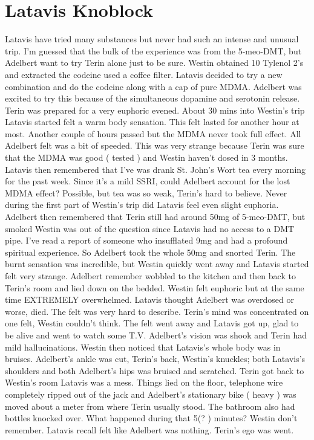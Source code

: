 \documentclass[12pt]{book}
\begin{document}
\chapter{Latavis Knoblock}

Latavis have tried many substances but never had such an intense and unusual trip. I'm guessed that the bulk of the experience was from the 5-meo-DMT, but Adelbert want to try Terin alone just to be sure. Westin obtained 10 Tylenol 2's and extracted the codeine used a coffee filter. Latavis decided to try a new combination and do the codeine along with a cap of pure MDMA. Adelbert was excited to try this because of the simultaneous dopamine and serotonin release. Terin was prepared for a very euphoric evened. About 30 mins into Westin's trip Latavis started felt a warm body sensation. This felt lasted for another hour at most. Another couple of hours passed but the MDMA never took full effect. All Adelbert felt was a bit of speeded. This was very strange because Terin was sure that the MDMA was good ( tested ) and Westin haven't dosed in 3 months. Latavis then remembered that I've was drank St. John's Wort tea every morning for the past week. Since it's a mild SSRI, could Adelbert account for the lost MDMA effect? Possible, but tea was so weak, Terin's hard to believe. Never during the first part of Westin's trip did Latavis feel even slight euphoria. Adelbert then remembered that Terin still had around 50mg of 5-meo-DMT, but smoked Westin was out of the question since Latavis had no access to a DMT pipe. I've read a report of someone who insufflated 9mg and had a profound spiritual experience. So Adelbert took the whole 50mg and snorted Terin. The burnt sensation was incredible, but Westin quickly went away and Latavis started felt very strange. Adelbert remember wobbled to the kitchen and then back to Terin's room and lied down on the bedded. Westin felt euphoric but at the same time EXTREMELY overwhelmed. Latavis thought Adelbert was overdosed or worse, died. The felt was very hard to describe. Terin's mind was concentrated on one felt, Westin couldn't think. The felt went away and Latavis got up, glad to be alive and went to watch some T.V. Adelbert's vision was shook and Terin had mild hallucinations. Westin then noticed that Latavis's whole body was in bruises. Adelbert's ankle was cut, Terin's back, Westin's knuckles; both Latavis's shoulders and both Adelbert's hips was bruised and scratched. Terin got back to Westin's room Latavis was a mess. Things lied on the floor, telephone wire completely ripped out of the jack and Adelbert's stationary bike ( heavy ) was moved about a meter from where Terin usually stood. The bathroom also had bottles knocked over. What happened during that 5(? ) minutes? Westin don't remember. Latavis recall felt like Adelbert was nothing. Terin's ego was went.
\end{document}
